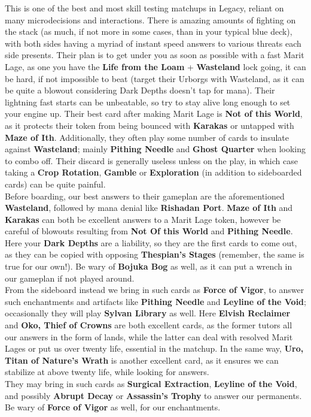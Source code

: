 \documentclass{report}
\begin{document}
This is one of the best and most skill testing matchups in Legacy, reliant on many microdecisions and interactions. There is amazing amounts of fighting on the stack (as much, if not more in some cases, than in your typical blue deck), with both sides having a myriad of instant speed answers to various threats each side presents. Their plan is to get under you as soon as possible with a fast Marit Lage, as one you have the \textbf{Life from the Loam} + \textbf{Wasteland} lock going, it can be hard, if not impossible to beat (target their Urborgs with Wasteland, as it can be quite a blowout considering Dark Depths doesn't tap for mana). Their lightning fast starts can be unbeatable, so try to stay alive long enough to set your engine up. Their best card after making Marit Lage is \textbf{Not of this World}, as it protects their token from being bounced with \textbf{Karakas} or untapped with \textbf{Maze of Ith}. Additionally, they often play some number of cards to insulate against \textbf{Wasteland}; mainly \textbf{Pithing Needle} and \textbf{Ghost Quarter} when looking to combo off. Their discard is generally useless unless on the play, in which case taking a \textbf{Crop Rotation}, \textbf{Gamble} or \textbf{Exploration} (in addition to sideboarded cards) can be quite painful.\\ Before boarding, our best answers to their gameplan are the aforementioned \textbf{Wasteland}, followed by mana denial like \textbf{Rishadan Port}. \textbf{Maze of Ith} and \textbf{Karakas} can both be excellent answers to a Marit Lage token, however be careful of blowouts resulting from \textbf{Not Of this World} and \textbf{Pithing Needle}. Here your \textbf{Dark Depths} are a liability, so they are the first cards to come out, as they can be copied with opposing \textbf{Thespian's Stages} (remember, the same is true for our own!). Be wary of \textbf{Bojuka Bog} as well, as it can put a wrench in our gameplan if not played around.\\ From the sideboard instead we bring in such cards as \textbf{Force of Vigor}, to answer such enchantments and artifacts like \textbf{Pithing Needle} and \textbf{Leyline of the Void}; occasionally they will play \textbf{Sylvan Library} as well. Here \textbf{Elvish Reclaimer} and \textbf{Oko, Thief of Crowns} are both excellent cards, as the former tutors all our answers in the form of lands, while the latter can deal with resolved Marit Lages or put us over twenty life, essential in the matchup. In the same way, \textbf{Uro, Titan of Nature's Wrath} is another excellent card, as it ensures we can stabilize at above twenty life, while looking for answers.\\ They may bring in such cards as \textbf{Surgical Extraction}, \textbf{Leyline of the Void}, and possibly \textbf{Abrupt Decay} or \textbf{Assassin's Trophy} to answer our permanents. Be wary of \textbf{Force of Vigor} as well, for our enchantments.\\\\
\end{document}
